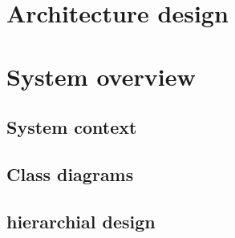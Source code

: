 \chapter{Architecture design}
\label{chapter:intro}

\chapter{System overview}

\section{System context}
\section{Class diagrams}
\section{hierarchial design}
